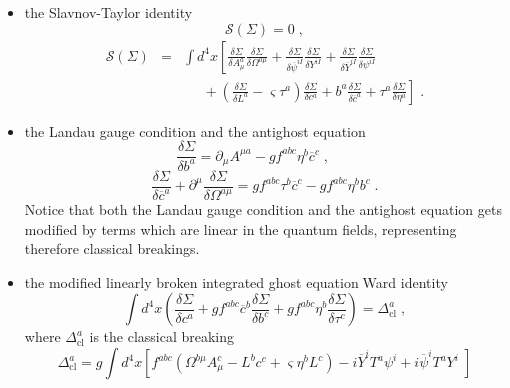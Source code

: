 \documentclass[a4paper,12pt]{article}
\begin{document}
\begin{itemize}
\item  the Slavnov-Taylor identity 
\begin{equation}
\mathcal{S}(\Sigma )=0\;,  \label{stf}
\end{equation}
\begin{eqnarray}
\mathcal{S}(\Sigma ) &=&\int d^{4}x\left[ \frac{\delta \Sigma }{\delta
A_{\mu }^{a}}\frac{\delta \Sigma }{\delta \Omega ^{a\mu }}+\frac{\delta
\Sigma }{\delta \overline{\psi }^{iI}}\frac{\delta \Sigma }{\delta Y^{iI}}+%
\frac{\delta \Sigma }{\delta \overline{Y}^{iI}}\frac{\delta \Sigma }{\delta
\psi ^{iI}}\right.   \nonumber \\
&&\left. \;\;\;\;\;+\left( \frac{\delta \Sigma }{\delta L^{a}}-\varsigma
\tau ^{a}\right) \frac{\delta \Sigma }{\delta c^{a}}+b^{a}\frac{\delta
\Sigma }{\delta \overline{c}^{a}}+\tau ^{a}\frac{\delta \Sigma }{\delta \eta
^{a}}\right] \;.  \label{stfop}
\end{eqnarray}

\item  the Landau gauge condition and the antighost equation 
\begin{equation}
\frac{\delta \Sigma }{\delta b^{a}}=\partial _{\mu }A^{\mu a}-gf^{abc}\eta
^{b}\overline{c}^{c}\;,\;\;\;\;\;\;  \label{lgh}
\end{equation}
\begin{equation}
\frac{\delta \Sigma }{\delta \overline{c}^{a}}+\partial ^{\mu }\frac{\delta
\Sigma }{\delta \Omega ^{a\mu }}=gf^{abc}\tau ^{b}\overline{c}%
^{c}-gf^{abc}\eta ^{b}b^{c}\;.  \label{agh}
\end{equation}
Notice that both the Landau gauge condition and the antighost equation gets
modified by terms which are linear in the quantum fields, representing
therefore classical breakings.

\item  the modified linearly broken integrated ghost equation$\;$Ward
identity 
\begin{equation}
\int d^{4}x\left( \frac{\delta \Sigma }{\delta c^{a}}+gf^{abc}\overline{c}%
^{b}\frac{\delta \Sigma }{\delta b^{c}}+gf^{abc}\eta ^{b}\frac{\delta \Sigma 
}{\delta \tau ^{c}}\right) =\Delta _{\mathrm{cl}}^{a}\;,  \label{wgh}
\end{equation}
where $\Delta _{\mathrm{cl}}^{a}$ is the classical breaking 
\begin{equation}
\Delta _{\mathrm{cl}}^{a}=g\int d^{4}x\left[ f^{abc}\left( \Omega ^{b\mu
}A_{\mu }^{c}-L^{b}c^{c}+\varsigma \eta ^{b}L^{c}\right) -i\overline{Y}%
^{i}T^{a}\psi ^{i}+i\overline{\psi }^{i}T^{a}Y^{i}\;\right]   \label{bgh}
\end{equation}
\end{itemize}
\end{document}
